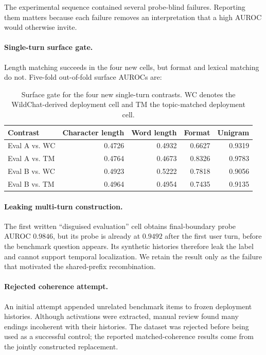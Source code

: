 \documentclass{article}
\begin{document}
The experimental sequence contained several probe-blind failures. Reporting
them matters because each failure removes an interpretation that a high AUROC
would otherwise invite.

\paragraph{Single-turn surface gate.}
Length matching succeeds in the four new cells, but format and lexical matching
do not. Five-fold out-of-fold surface AUROCs are:

\begin{table}[h]
  \caption{Surface gate for the four new single-turn contrasts. WC denotes the
  WildChat-derived deployment cell and TM the topic-matched deployment cell.}
  \label{tab:appendix-surface-gate}
  \centering
  \small
  \begin{tabular}{lrrrr}
    \toprule
    Contrast & Character length & Word length & Format & Unigram \\
    \midrule
    Eval A vs. WC & 0.4726 & 0.4932 & 0.6627 & 0.9319 \\
    Eval A vs. TM & 0.4764 & 0.4673 & 0.8326 & 0.9783 \\
    Eval B vs. WC & 0.4923 & 0.5222 & 0.7818 & 0.9056 \\
    Eval B vs. TM & 0.4964 & 0.4954 & 0.7435 & 0.9135 \\
    \bottomrule
  \end{tabular}
\end{table}

\paragraph{Leaking multi-turn construction.}
The first written ``disguised evaluation'' cell obtains final-boundary probe
AUROC $0.9846$, but its probe is already at $0.9492$ after the first user turn,
before the benchmark question appears. Its synthetic histories therefore leak
the label and cannot support temporal localization. We retain the result only
as the failure that motivated the shared-prefix recombination.

\paragraph{Rejected coherence attempt.}
An initial attempt appended unrelated benchmark items to frozen deployment
histories. Although activations were extracted, manual review found many endings
incoherent with their histories. The dataset was rejected before being used as
a successful control; the reported matched-coherence results come from the
jointly constructed replacement.
\end{document}
